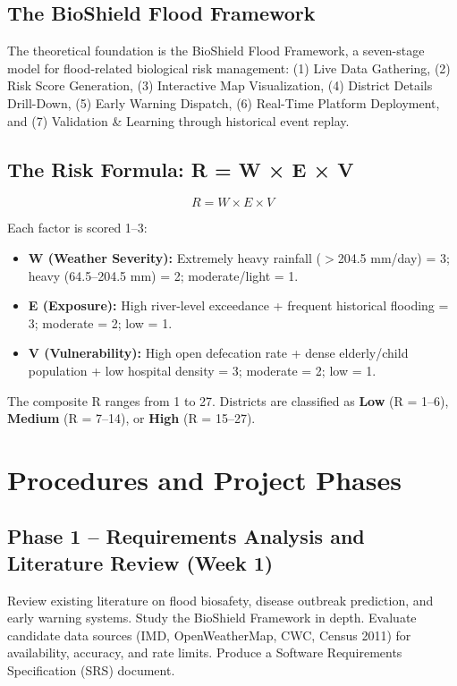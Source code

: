 \documentclass[12pt,a4paper]{report}
\begin{document}
\subsection{The BioShield Flood Framework}

The theoretical foundation is the BioShield Flood Framework, a seven-stage model for flood-related biological risk management: (1) Live Data Gathering, (2) Risk Score Generation, (3) Interactive Map Visualization, (4) District Details Drill-Down, (5) Early Warning Dispatch, (6) Real-Time Platform Deployment, and (7) Validation \& Learning through historical event replay.

\subsection{The Risk Formula: R = W × E × V}

\begin{equation}
  R = W \times E \times V
  \label{eq:risk}
\end{equation}

Each factor is scored 1--3:
\begin{itemize}[noitemsep]
  \item \textbf{W (Weather Severity):} Extremely heavy rainfall ($>$204.5 mm/day) = 3; heavy (64.5--204.5 mm) = 2; moderate/light = 1.
  \item \textbf{E (Exposure):} High river-level exceedance + frequent historical flooding = 3; moderate = 2; low = 1.
  \item \textbf{V (Vulnerability):} High open defecation rate + dense elderly/child population + low hospital density = 3; moderate = 2; low = 1.
\end{itemize}

The composite R ranges from 1 to 27. Districts are classified as \textbf{Low} (R = 1--6), \textbf{Medium} (R = 7--14), or \textbf{High} (R = 15--27).

\section{Procedures and Project Phases}

\subsection{Phase 1 -- Requirements Analysis and Literature Review (Week 1)}
Review existing literature on flood biosafety, disease outbreak prediction, and early warning systems. Study the BioShield Framework in depth. Evaluate candidate data sources (IMD, OpenWeatherMap, CWC, Census 2011) for availability, accuracy, and rate limits. Produce a Software Requirements Specification (SRS) document.
\end{document}
